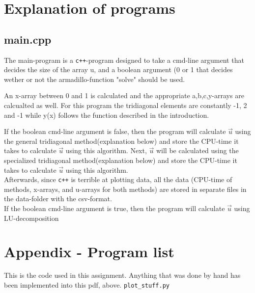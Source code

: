 \documentclass[11pt,a4paper,notitlepage]{article}
\begin{document}
\section{Explanation of programs}
\subsection{main.cpp}
	The main-program is a \verb|c++|-program designed to take a cmd-line argument that decides the size of the array u, and a boolean argument (0 or 1 that decides wether or not the armadillo-function "solve" should be used.
	
	An x-array between 0 and 1 is calculated and the appropriate a,b,c,y-arrays are calcualted as well. For this program the tridiagonal elements are constantly -1, 2 and -1 while y(x) follows the function described in the introduction. 
	
	If the boolean cmd-line argument is false, then the program will calculate $\vec{u}$ using the general tridiagonal method(explanation below) and store the CPU-time it takes to calculate $\vec{u}$ using this algorithm.
	Next, $\vec{u}$ will be calculated using the specialized tridiagonal method(explanation below) and store the CPU-time it takes to calculate $\vec{u}$ using this algorithm. \\
	Afterwards, since \verb|c++| is terrible at plotting data, all the data (CPU-time of methods, x-arrays, and u-arrays for both methods) are stored in separate files in the data-folder with the csv-format. \\
	
	If the boolean cmd-line argument is true, then the program will calculate $\vec{u}$ using LU-decomposition
	
\begin{center}
\end{center}

\newpage
\section{Appendix - Program list}
This is the code used in this assignment. Anything that was done by hand has been implemented into this pdf, above.
\lstset{style=pystyle}
\verb|plot_stuff.py|

\end{document}
